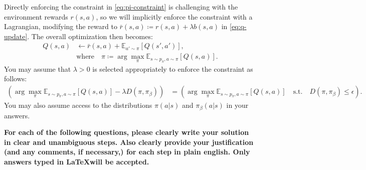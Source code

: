 \documentclass[letterpaper,12pt,addpoints]{exam}
\begin{document}
Directly enforcing the constraint in \cref{eq:pi-constraint} is challenging with the environment rewards $r(s,a)$, so we will implicitly
enforce the constraint with a Lagrangian, modifying the reward to $\bar{r}(s,a) \coloneqq r(s,a) + \lambda b(s,a)$ in \cref{eq:q-update}. The overall
optimization then becomes:
\begin{align*}
    Q(s,a) &\leftarrow \bar{r}(s,a) + \mathbb{E}_{a' \sim \pi} [Q(s',a')],\\
    &\text{where} \quad \pi \coloneqq \arg \max_\pi \mathbb{E}_{s\sim p_\pi,a \sim \pi} [Q(s,a)].
\end{align*}
You may assume that $\lambda > 0$ is selected appropriately to enforce the constraint as follows:
\begin{align*}
    \left( \arg \max_\pi \mathbb{E}_{s\sim p_\pi,a \sim \pi} [Q(s,a)] - \lambda D(\pi, \pi_\beta) \right)
    &= \left( \arg \max_\pi \mathbb{E}_{s\sim p_\pi,a \sim \pi} [Q(s,a)] \quad \text{s.t.} \quad D(\pi, \pi_\beta) \leq \epsilon \right).
\end{align*}
You may also assume access to the distributions $\pi(a | s)$ and $\pi_\beta(a | s)$ in your answers.

\textbf{For each of the following questions, please clearly write your solution in clear and unambiguous steps. Also clearly provide your justification (and any comments, if necessary,) for each step in plain english. Only answers typed in \LaTeX will be accepted.}
\end{document}
